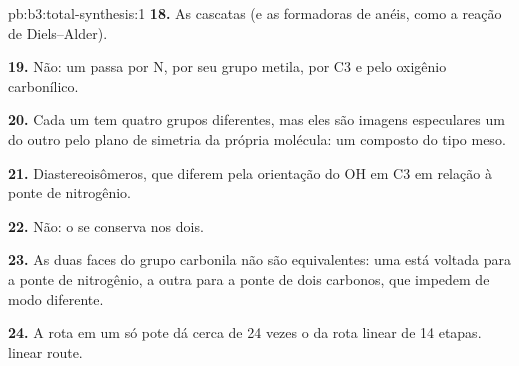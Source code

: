 \begin{solution}{pb:b3:total-synthesis:1}
\textbf{18.} As cascatas (e as  formadoras de anéis, como a reação de
Diels--Alder).

\textbf{19.} Não: um  passa por N, por seu grupo metila, por C3 e pelo oxigênio
carbonílico.

\textbf{20.} Cada um tem quatro grupos diferentes, mas eles são imagens especulares um do outro pelo
plano de simetria da própria molécula: um composto do tipo meso.

\textbf{21.} Diastereoisômeros, que diferem pela orientação do OH em C3 em relação à
ponte de nitrogênio.

\textbf{22.} Não: o  se conserva nos dois.

\textbf{23.} As duas faces do grupo carbonila não são equivalentes: uma está voltada para a
ponte de nitrogênio, a outra para a ponte de dois carbonos, que impedem de modo diferente.

\textbf{24.} A rota em um só pote dá cerca de 24 vezes o  da rota
linear de 14 etapas.
linear route.
\end{solution}
